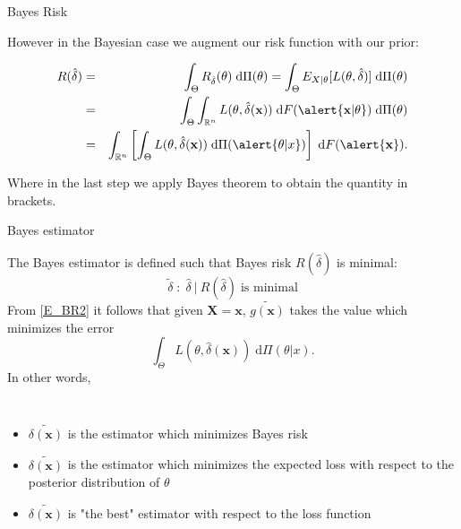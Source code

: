 \documentclass[11pt]{beamer}
\begin{document}
\begin{frame}{Bayes Risk}

However in the Bayesian case we augment our risk function with our prior:

\begin{eqnarray}
R(\hat{\delta}) &=& \int_\Theta R_{\hat{\delta}}(\theta) \;\text{d}\Pi(\theta)
	 = \int_\Theta E_{X|\theta}[L(\theta,\hat{\delta})] \;\text{d}\Pi(\theta) \nonumber \\
	 &=& \int_\Theta \int_{\mathbb{R}^n} L(\theta,\hat{\delta}(\mathbf{x})) \;\text{d}F(\alert{\mathbf{x}|\theta}) \;\text{d}\Pi(\theta)  \nonumber \\
 	 &=& \int_{\mathbb{R}^n} \left[ \int_\Theta L(\theta,\hat{\delta}(\mathbf{x})) \;\text{d}\Pi(\alert{\theta|x}) \right] \;\text{d}F(\alert{\mathbf{x}}). \label{E_BR2}
\end{eqnarray}

Where in the last step we apply Bayes theorem to obtain the quantity in brackets. 

\end{frame}
\begin{frame}{Bayes estimator}

The Bayes estimator is defined such that Bayes risk $R(\hat{\delta})$ is minimal:
\begin{equation}
\widetilde{\delta}\; : \; \hat{\delta} \:|\: R(\hat{\delta}) \;\text{is minimal}
\end{equation}
From \eqref{E_BR2} it follows that given $\mathbf{X}=\mathbf{x}$, \alert{$\widetilde{g(\mathbf{x})}$ takes the value which minimizes the error}
$$\int_\Theta L(\theta,\hat{\delta}(\mathbf{x})) \;\text{d}\Pi(\theta|x).$$
In other words,
\begin{columns}
\begin{itemize}
\item $\widetilde{\delta(\mathbf{x})}$ is the estimator which minimizes Bayes risk
     \item $\widetilde{\delta(\mathbf{x})}$ is the estimator which minimizes the expected loss with respect to the posterior distribution of $\theta$
\item $\widetilde{\delta(\mathbf{x})}$ is \alert{"the best" estimator} with respect to the loss function
\end{itemize}
\end{columns}

\end{frame}
\end{document}
